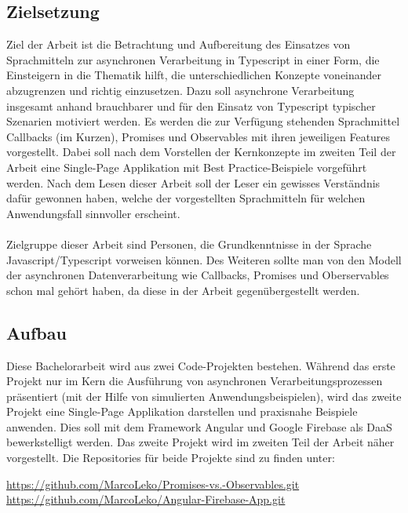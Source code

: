 \subsection{Zielsetzung}

Ziel der Arbeit ist die Betrachtung und Aufbereitung des Einsatzes von Sprachmitteln zur asynchronen Verarbeitung in Typescript in einer Form, die Einsteigern in die Thematik hilft, die unterschiedlichen Konzepte voneinander abzugrenzen und richtig einzusetzen. Dazu soll asynchrone Verarbeitung insgesamt anhand brauchbarer und für den Einsatz von Typescript typischer Szenarien motiviert werden. Es werden die zur Verfügung stehenden Sprachmittel Callbacks (im Kurzen), Promises und Observables mit ihren jeweiligen Features vorgestellt. Dabei soll nach dem Vorstellen der Kernkonzepte im zweiten Teil der Arbeit eine Single-Page Applikation mit \glqq Best Practice\grqq{}-Beispiele vorgeführt werden. Nach dem Lesen dieser Arbeit soll der Leser ein gewisses Verständnis dafür gewonnen haben, welche der vorgestellten Sprachmitteln für welchen Anwendungsfall sinnvoller erscheint.\\\\

\noindent
Zielgruppe dieser Arbeit sind Personen, die Grundkenntnisse in der Sprache Javascript/Typescript vorweisen können. Des Weiteren sollte man von den Modell der asynchronen Datenverarbeitung wie Callbacks, Promises und Oberservables schon mal gehört haben, da diese in der Arbeit gegenübergestellt werden.

\subsection{Aufbau}

Diese Bachelorarbeit wird aus zwei Code-Projekten bestehen. Während das erste Projekt nur im Kern die Ausführung von asynchronen Verarbeitungsprozessen präsentiert (mit der Hilfe von simulierten Anwendungsbeispielen), wird das zweite Projekt eine Single-Page Applikation darstellen und praxisnahe Beispiele anwenden. Dies soll mit dem Framework Angular und Google Firebase als DaaS bewerkstelligt werden. Das zweite Projekt wird im zweiten Teil der Arbeit näher vorgestellt. Die Repositories für beide Projekte sind zu finden unter: 

\begin{center}
\url{https://github.com/MarcoLeko/Promises-vs.-Observables.git} \\
\url{https://github.com/MarcoLeko/Angular-Firebase-App.git}
\end{center}

